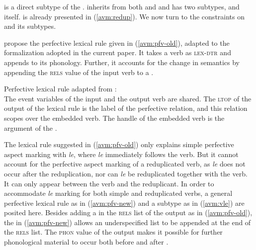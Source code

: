  is a direct subtype of the .
 inherits from both  and 
and has two subtypes,  and  itself.
 is already presented in (\ref{avm:redup}). 
We now turn to the constraints on  and its subtypes.


\citet[246]{MuellerLipenkova2013} propose the perfective lexical rule given in (\ref{avm:pfv-old}), 
adapted to the formalization adopted in the current paper.
It takes a verb as \textsc{lex-dtr}
and appends  to its phonology.
Further, it accounts for the change in semantics by appending the \textsc{rels} value of the input verb to a .

\ea\label{avm:pfv-old}
Perfective lexical rule adapted from \citet[246]{MuellerLipenkova2013}:\\
\z
The event variables  of the input and the output verb are shared. 
The \textsc{ltop} of the output of the lexical rule  is the label of the perfective relation, 
and this relation scopes over the embedded verb. 
The handle of the embedded verb  is the argument of the . 

The lexical rule suggested in (\ref{avm:pfv-old}) only explains simple perfective aspect marking with \textit{le}, 
where \textit{le} immediately follows the verb.
But it cannot account for the perfective aspect marking of a reduplicated verb,
 as \textit{le} does not occur after the reduplication, 
nor can \textit{le} be reduplicated together with the verb.
It can only appear between the verb and the reduplicant.
In order to accommodate \textit{le} marking for both simple and reduplicated verbs, 
a general perfective lexical rule as in (\ref{avm:pfv-new}) and 
a subtype  as in (\ref{avm:vle}) are posited here.
Besides adding a  in the \textsc{rels} list of the output as in (\ref{avm:pfv-old}), 
the  in (\ref{avm:pfv-new}) allows an underspecified list to be appended at the end of the \textsc{rels} list.
The \textsc{phon} value of the output makes it possible for further phonological material to occur both before and after .

